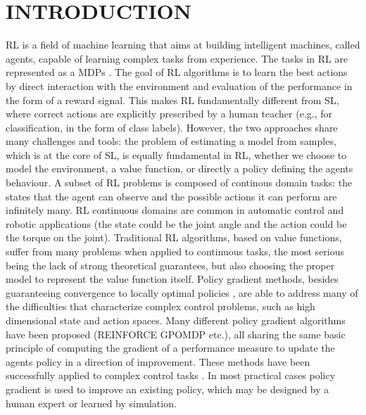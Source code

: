 
\chapter{INTRODUCTION} \label{chap:aChapter}

\acf{RL} is a field of machine learning that aims at building intelligent machines, called agents, capable of learning complex tasks from experience.
The tasks in \acs{RL} are represented as a \acf{MDP}s \citep{puterman1990markov}. 
The goal of \acs{RL} \citep{sutton1998reinforcement} algorithms is to learn the best actions by direct interaction with the environment and evaluation of the performance in the form of a reward signal.
This makes \acs{RL} fundamentally different from \acf{SL}, where correct actions are explicitly prescribed by a human teacher (e.g., for classification, in the form of class labels).
However, the two approaches share many challenges and tools: the problem of estimating a model from samples, which is at the core of \acs{SL}, is equally fundamental in \acs{RL}, whether we choose to model the environment, a value function, or directly a policy defining the agent\textquotesingle s behaviour.
A subset of \acs{RL} problems is composed of continous domain tasks: the states that the agent can observe and the possible actions it can perform are infinitely many.
\acs{RL} continuous domains are common in automatic control and robotic applications (\eg the state could be the joint angle and the action could be the torque on the joint). Traditional \acs{RL} algorithms, based on value functions, suffer from many problems when applied to continuous tasks, the most serious being the lack of strong theoretical guarantees, but also choosing the proper model to represent the value function itself. Policy gradient methods, besides guaranteeing convergence to locally optimal policies \citep{sutton2000policy}, are able to address many of the difficulties that characterize complex control problems, such as high dimensional state and action spaces. 
Many different policy gradient algorithms have been proposed (\eg REINFORCE \citep{williams1992simple} GPOMDP \citep{baxter2001infinite} etc.), all sharing the same basic principle of computing the gradient of a performance measure to update the agent\textquotesingle s policy in a direction of improvement. These methods have been successfully applied to complex control tasks \citep{deisenroth2013survey}. In most practical cases policy gradient is used to improve an existing policy, which may be designed by a human expert or learned by simulation.\newline
